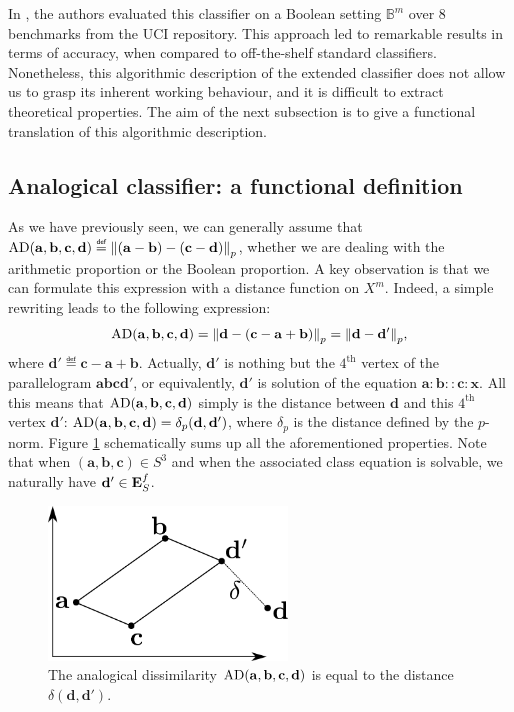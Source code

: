 In \cite{BayMicDelIJCAI07}, the authors evaluated this classifier on a Boolean
setting $\mathbb{B}^m$ over 8 benchmarks from the UCI repository.  This
approach led to remarkable results in terms of accuracy, when compared to
off-the-shelf standard classifiers. Nonetheless, this algorithmic description
of the extended classifier does not allow us to grasp its inherent working
behaviour, and it is difficult to extract theoretical properties. The aim of
the next subsection is to give a functional translation of this algorithmic
description.

\subsection{Analogical classifier: a functional definition}
\label{SEC:functional_definition}

As we have previously seen, we can generally assume that
$\AD(\mathbf{a},\mathbf{b},\mathbf{c},\mathbf{d}) \eqdef
\norm{p}{(\mathbf{a}-\mathbf{b})-(\mathbf{c}-\mathbf{d})}$, whether we are
dealing with the arithmetic proportion or the Boolean proportion.
A key observation is that we can formulate this expression with a distance
function on $X^m$. Indeed, a simple rewriting leads to the following expression:
$$\AD(\mathbf{a},\mathbf{b},\mathbf{c},\mathbf{d})=\norm{p}{\mathbf{d} -
(\mathbf{c}-\mathbf{a}+\mathbf{b})}=\norm{p}{\mathbf{d} - \mathbf{d}'},$$
where $\mathbf{d}'\eqdef\mathbf{c}-\mathbf{a}+\mathbf{b}$. Actually,
$\mathbf{d}'$ is nothing but the $4^\text{th}$ vertex of the parallelogram
$\mathbf{a}\mathbf{b}\mathbf{c}\mathbf{d}'$, or equivalently, $\mathbf{d}'$ is
solution of the equation $\mathbf{a}: \mathbf{b} :: \mathbf{c} : \mathbf{x}$.
All this means that $\AD(\mathbf{a},\mathbf{b},\mathbf{c},\mathbf{d})$ simply
is the distance between $\mathbf{d}$ and this $4^\text{th}$ vertex
$\mathbf{d}'$: $\AD(\mathbf{a},\mathbf{b},\mathbf{c},\mathbf{d}) =
\delta_p(\mathbf{d}, \mathbf{d}')$, where $\delta_p$ is the distance defined by
the $p$-norm. Figure \ref{FIG:analogical_dissimilarity} schematically sums up all the aforementioned
properties.  Note that when $(\mathbf{a}, \mathbf{b}, \mathbf{c}) \in S^3$ and
when the associated class equation is solvable, we naturally have $\mathbf{d}'
\in \esf$.
\begin{figure}[!h]
\centering
  \includegraphics[width=2.5in]{figures/analogical_dissimilarity.pdf}
  \caption{The analogical dissimilarity
  $\AD(\mathbf{a},\mathbf{b},\mathbf{c},\mathbf{d})$ is equal to the distance
  $\delta(\mathbf{d}, \mathbf{d}')$.}
\label{FIG:analogical_dissimilarity}
\end{figure}


